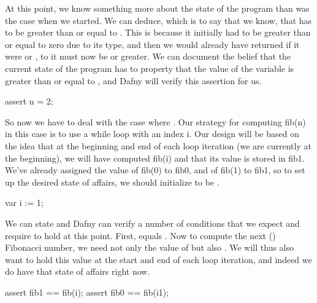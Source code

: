 \documentclass[letterpaper,10pt,english]{sphinxmanual}
\begin{document}
At this point, we know something more about the state of the program
than was the case when we started. We can deduce, which is to say that
we know, that  has to be greater than or equal to . This is
because it initially had to be greater than or equal to zero due to
its type, and then we would already have returned if it were  or
, to it must now be  or greater. We can document the belief
that the current state of the program has to property that the value
of the variable  is greater than or equal to , and Dafny will
verify this assertion for us.

\begin{sphinxVerbatim}[commandchars=\\\{\}]
assert n \PYGZgt{}= 2;
\end{sphinxVerbatim}

So now we have to deal with the case where . Our strategy for
computing fib(n) in this case is to use a while loop with an index i.
Our design will be based on the idea that at the beginning and end of
each loop iteration (we are currently at the beginning), we will have
computed fib(i) and that its value is stored in fib1. We’ve already
assigned the value of fib(0) to fib0, and of fib(1) to fib1, so to set
up the desired state of affairs, we should initialize  to be .

\begin{sphinxVerbatim}[commandchars=\\\{\}]
var i := 1;
\end{sphinxVerbatim}

We can state and Dafny can verify a number of conditions that we
expect and require to hold at this point. First,  equals
. Now to compute the next () Fibonacci number, we need
not only the value of  but also . We will thus also
want  to hold this value at the start and end of each loop
iteration, and indeed we do have that state of affairs right now.

\begin{sphinxVerbatim}[commandchars=\\\{\}]
assert fib1 == fib(i);
assert fib0 == fib(i\PYGZhy{}1);
\end{sphinxVerbatim}
\end{document}

